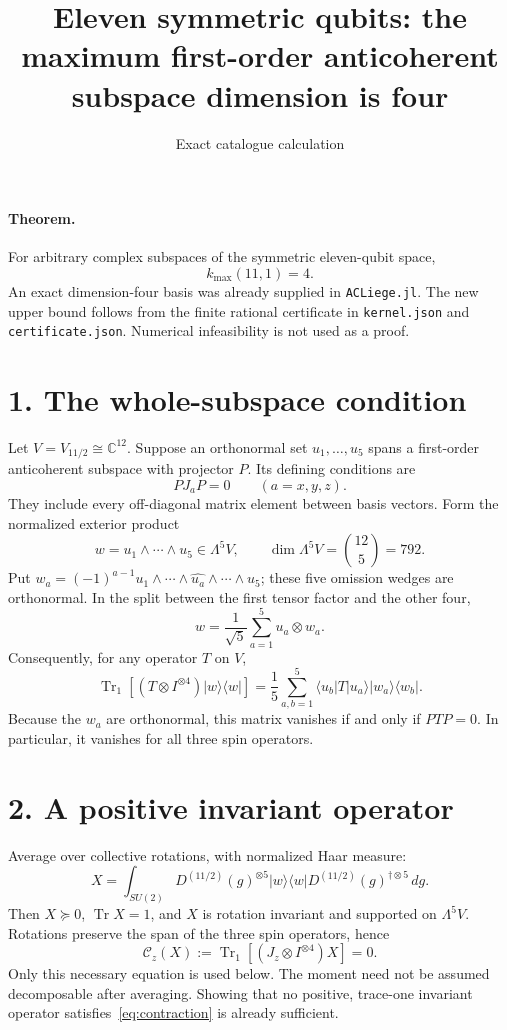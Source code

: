 \documentclass[11pt]{article}
\newcommand{\Tr}{\operatorname{Tr}}
\begin{document}
\title{Eleven symmetric qubits: the maximum first-order anticoherent subspace dimension is four}
\author{Exact catalogue calculation}
\date{}
\maketitle
\paragraph{Theorem.} For arbitrary complex subspaces of the symmetric eleven-qubit space,
\[
\boxed{k_{\max}(11,1)=4.}
\]
An exact dimension-four basis was already supplied in \texttt{ACLiege.jl}. The new upper bound follows from the finite rational certificate in \texttt{kernel.json} and \texttt{certificate.json}. Numerical infeasibility is not used as a proof.

\section*{1. The whole-subspace condition}
Let $V=V_{11/2}\cong\mathbb C^{12}$. Suppose an orthonormal set $u_1,\ldots,u_5$ spans a first-order anticoherent subspace with projector $P$. Its defining conditions are
\[
PJ_aP=0\qquad(a=x,y,z).
\]
They include every off-diagonal matrix element between basis vectors. Form the normalized exterior product
\[
w=u_1\wedge\cdots\wedge u_5\in\Lambda^5V,\qquad
\dim\Lambda^5V=\binom{12}{5}=792.
\]
Put $w_a=(-1)^{a-1}u_1\wedge\cdots\wedge\widehat{u_a}\wedge\cdots\wedge u_5$; these five omission wedges are orthonormal. In the split between the first tensor factor and the other four,
\[
w=\frac1{\sqrt5}\sum_{a=1}^5u_a\otimes w_a.
\]
Consequently, for any operator $T$ on $V$,
\[
\Tr_1[(T\otimes I^{\otimes4})|w\rangle\langle w|]
=\frac15\sum_{a,b=1}^5\langle u_b|T|u_a\rangle
|w_a\rangle\langle w_b|.
\]
Because the $w_a$ are orthonormal, this matrix vanishes if and only if $PTP=0$. In particular, it vanishes for all three spin operators.

\section*{2. A positive invariant operator}
Average over collective rotations, with normalized Haar measure:
\[
X=\int_{SU(2)}D^{(11/2)}(g)^{\otimes5}|w\rangle\langle w|
D^{(11/2)}(g)^{\dagger\otimes5}\,dg.
\]
Then $X\succeq0$, $\Tr X=1$, and $X$ is rotation invariant and supported on $\Lambda^5V$. Rotations preserve the span of the three spin operators, hence
\begin{equation}\label{eq:contraction}
\mathcal C_z(X):=\Tr_1[(J_z\otimes I^{\otimes4})X]=0.
\end{equation}
Only this necessary equation is used below. The moment need not be assumed decomposable after averaging. Showing that no positive, trace-one invariant operator satisfies~\eqref{eq:contraction} is already sufficient.
\end{document}
